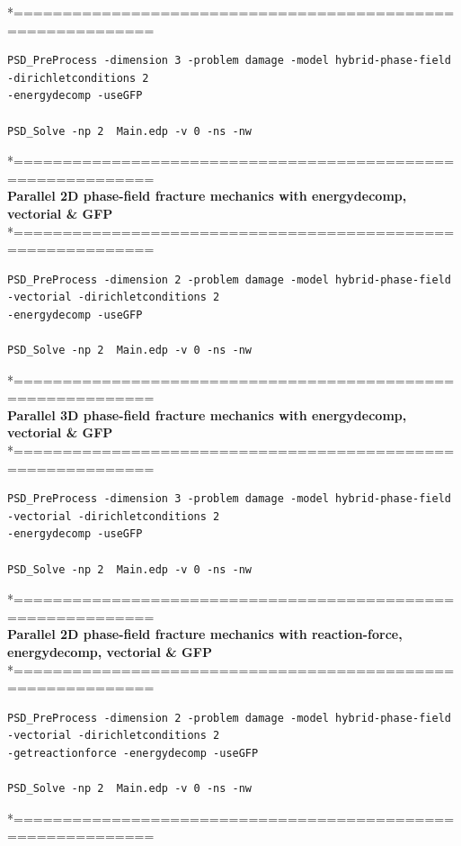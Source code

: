 *============================================================\\
\begin{lstlisting}[style=Linux]
PSD_PreProcess -dimension 3 -problem damage -model hybrid-phase-field -dirichletconditions 2
-energydecomp -useGFP   

PSD_Solve -np 2  Main.edp -v 0 -ns -nw   	
\end{lstlisting}
*============================================================\\
 \textbf{Parallel 2D phase-field fracture mechanics with energydecomp, vectorial \& GFP} \\
*============================================================\\
\begin{lstlisting}[style=Linux]
PSD_PreProcess -dimension 2 -problem damage -model hybrid-phase-field -vectorial -dirichletconditions 2 
-energydecomp -useGFP  

PSD_Solve -np 2  Main.edp -v 0 -ns -nw   
\end{lstlisting}
*============================================================\\
\textbf{ Parallel 3D phase-field fracture mechanics with energydecomp, vectorial \& GFP} \\
*============================================================\\
\begin{lstlisting}[style=Linux]
PSD_PreProcess -dimension 3 -problem damage -model hybrid-phase-field -vectorial -dirichletconditions 2
-energydecomp -useGFP   

PSD_Solve -np 2  Main.edp -v 0 -ns -nw   	
\end{lstlisting}
*============================================================\\
 \textbf{Parallel 2D phase-field fracture mechanics with reaction-force, energydecomp, vectorial \& GFP} \\
*============================================================\\
\begin{lstlisting}[style=Linux]
PSD_PreProcess -dimension 2 -problem damage -model hybrid-phase-field -vectorial -dirichletconditions 2 
-getreactionforce -energydecomp -useGFP  

PSD_Solve -np 2  Main.edp -v 0 -ns -nw   
\end{lstlisting}
*============================================================\\
